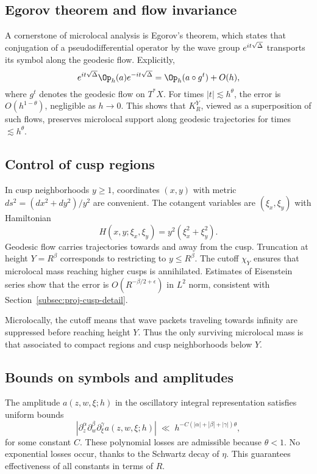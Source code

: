 \subsection{Egorov theorem and flow invariance}\label{subsec:micro-egorov}

A cornerstone of microlocal analysis is Egorov's theorem, which states that conjugation of a pseudodifferential operator by the wave group $e^{it\sqrt{\Delta}}$ transports its symbol along the geodesic flow. Explicitly,
\[
e^{it\sqrt{\Lap}} \Op_h(a) e^{-it\sqrt{\Lap}} = \Op_h(a\circ g^t) + O(h),
\]
where $g^t$ denotes the geodesic flow on $T^*X$. For times $|t|\lesssim h^\theta$, the error is $O(h^{1-\theta})$, negligible as $h\to 0$. This shows that $K_R^Y$, viewed as a superposition of such flows, preserves microlocal support along geodesic trajectories for times $\lesssim h^\theta$.

\subsection{Control of cusp regions}\label{subsec:micro-cusp}

In cusp neighborhoods $y\ge 1$, coordinates $(x,y)$ with metric $ds^2 = (dx^2+dy^2)/y^2$ are convenient. The cotangent variables are $(\xi_x,\xi_y)$ with Hamiltonian
\[
H(x,y;\xi_x,\xi_y) = y^2(\xi_x^2+\xi_y^2).
\]
Geodesic flow carries trajectories towards and away from the cusp. Truncation at height $Y=R^\beta$ corresponds to restricting to $y\le R^\beta$. The cutoff $\chi_Y$ ensures that microlocal mass reaching higher cusps is annihilated. Estimates of Eisenstein series show that the error is $O(R^{-\beta/2+\epsilon})$ in $L^2$ norm, consistent with Section~\ref{subsec:proj-cusp-detail}.

Microlocally, the cutoff means that wave packets traveling towards infinity are suppressed before reaching height $Y$. Thus the only surviving microlocal mass is that associated to compact regions and cusp neighborhoods below $Y$.

\subsection{Bounds on symbols and amplitudes}\label{subsec:micro-symbols}

The amplitude $a(z,w,\xi;h)$ in the oscillatory integral representation satisfies uniform bounds
\[
|\partial_z^\alpha \partial_w^\beta \partial_\xi^\gamma a(z,w,\xi;h)| \;\ll\; h^{-C(|\alpha|+|\beta|+|\gamma|)\theta},
\]
for some constant $C$. These polynomial losses are admissible because $\theta<1$. No exponential losses occur, thanks to the Schwartz decay of $\eta$. This guarantees effectiveness of all constants in terms of $R$.

